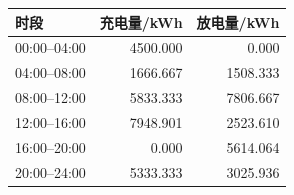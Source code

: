 \begin{tabular}{lrr}
\toprule
时段 & 充电量/kWh & 放电量/kWh \\
\midrule
00:00--04:00 & 4500.000 & 0.000 \\
04:00--08:00 & 1666.667 & 1508.333 \\
08:00--12:00 & 5833.333 & 7806.667 \\
12:00--16:00 & 7948.901 & 2523.610 \\
16:00--20:00 & 0.000 & 5614.064 \\
20:00--24:00 & 5333.333 & 3025.936 \\
\bottomrule
\end{tabular}
